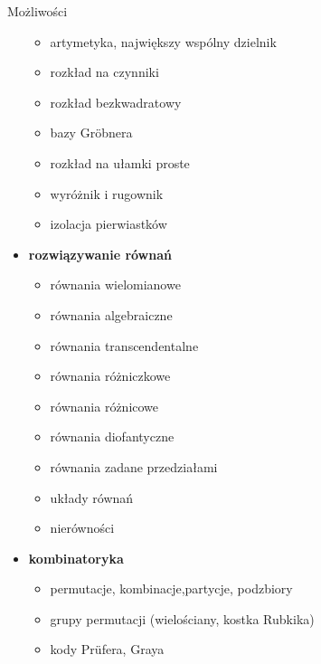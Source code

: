 \documentclass[10pt]{beamer}
\begin{document}
\begin{frame}{Możliwości}
\begin{multicols}{2}
\begin{itemize}
\begin{itemize}
          \tiny
          \item artymetyka, największy wspólny dzielnik
          \item rozkład na czynniki
          \item rozkład bezkwadratowy
          \item bazy Gröbnera
          \item rozkład na ułamki proste
          \item wyróżnik i rugownik
          \item izolacja pierwiastków
        \end{itemize}
      \item \textbf{rozwiązywanie równań}
        \begin{itemize}
          \tiny
          \item równania wielomianowe
          \item równania algebraiczne
          \item równania transcendentalne
          \item równania różniczkowe
          \item równania różnicowe
          \item równania diofantyczne
          \item równania zadane przedziałami
          \item układy równań
          \item nierówności
        \end{itemize}
      \item \textbf{kombinatoryka}
        \begin{itemize}
          \tiny
          \item permutacje, kombinacje,partycje, podzbiory
          \item grupy permutacji (wielościany, kostka Rubkika)
          \item kody Prüfera, Graya
        \end{itemize}
    \end{itemize}
  \end{multicols}
\end{frame}
\end{document}

